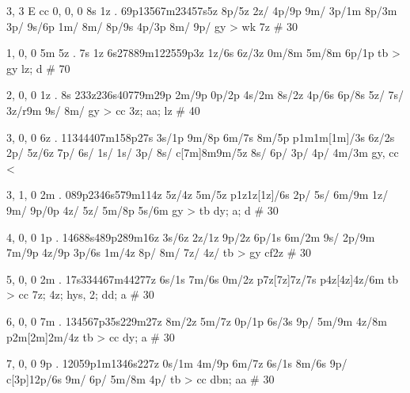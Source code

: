 3, 3
E
cc
0, 0, 0
8s 1z . 
69p13567m23457s5z
8p/5z
2z/
4p/9p 
9m/ 
3p/1m 
8p/3m 
3p/ 
9s/6p 
1m/ 
8m/ 
8p/9s
4p/3p 
8m/ 
9p/ 
gy > wk 
7z # 30 

1, 0, 0
5m 5z . 7s 1z
6s27889m122559p3z
1z/6s 
6z/3z 
0m/8m
5m/8m
6p/1p
tb > gy 
lz; d # 70 

2, 0, 0
1z . 8s
233z236s40779m29p
2m/9p 
0p/2p 
4s/2m 
8s/2z 
4p/6s 
6p/8s
5z/ 
7s/ 
3z/r9m 
9s/ 
8m/ 
gy > cc
3z; aa; lz # 40

3, 0, 0
6z . 
11344407m158p27s
3s/1p 
9m/8p
6m/7s 
8m/5p
p1m1m[1m]/3s
6z/2s
2p/
5z/6z 
7p/
6s/
1s/
1s/
3p/
8s/
c[7m]8m9m/5z
8s/
6p/
3p/
4p/
4m/3m
gy, cc <

3, 1, 0
2m . 
089p2346s579m114z
5z/4z
5m/5z
p1z1z[1z]/6s
2p/
5s/
6m/9m
1z/
9m/
9p/0p 
4z/ 
5z/ 
5m/8p
5s/6m
gy > tb 
dy; a; d # 30

4, 0, 0
1p . 
14688s489p289m16z
3s/6z 
2z/1z 
9p/2z 
6p/1s 
6m/2m 
9s/
2p/9m 
7m/9p 
4z/9p 
3p/6s 
1m/4z 
8p/ 
8m/ 
7z/ 
4z/
tb > gy 
cf2z # 30 

5, 0, 0 
2m . 
17s334467m44277z
6s/1s
7m/6s 
0m/2z 
p7z[7z]7z/7s
p4z[4z]4z/6m
tb > cc 
7z; 4z; hys, 2; dd; a # 30

6, 0, 0
7m . 
134567p35s229m27z
8m/2z 
5m/7z
0p/1p 
6s/3s 
9p/
5m/9m 
4z/8m 
p2m[2m]2m/4z
tb > cc 
dy; a # 30

7, 0, 0
9p . 
12059p1m1346s227z
0s/1m 
4m/9p
6m/7z
6s/1s 
8m/6s 
9p/
c[3p]12p/6s 
9m/
6p/
5m/8m 
4p/
tb > cc 
dbn; aa # 30
